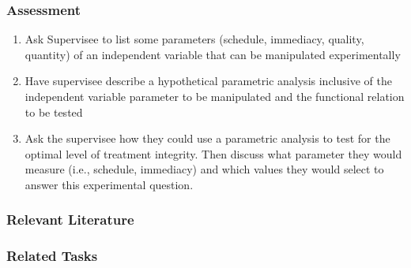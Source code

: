 \subsection{Assessment}
\begin{enumerate}
\item Ask Supervisee to list some parameters (schedule, immediacy, quality, quantity) of an independent variable that can be manipulated experimentally
\item Have supervisee describe a hypothetical parametric analysis inclusive of the independent variable parameter to be manipulated and the functional relation to be tested 
\item Ask the supervisee how they could use a parametric analysis to test for the optimal level of treatment integrity. Then discuss what parameter they would measure (i.e., schedule, immediacy) and which values they would select to answer this experimental question.  
\end{enumerate}
%
\subsection{Relevant Literature}
\begin{refsection}
\nocite{test,alang2017police,clayton2018black}
\printbibliography[heading=none]
\end{refsection}
%
\subsection{Related Tasks} 
\fourbThree{}\\
\fourFKThirtyThree{}\\
%
%
%
%
%
%
%
%
\chapter{\foursecc{}}
\section[\fourcOne{}]{\fourcOne{}%
              }

